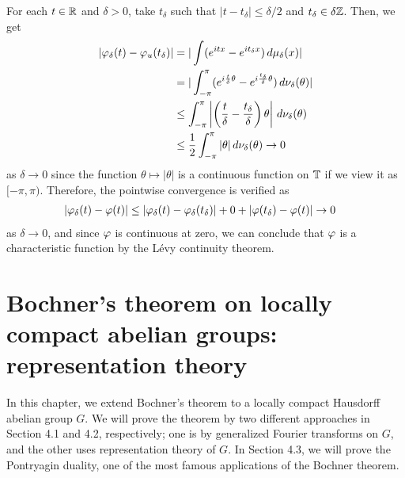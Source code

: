 \documentclass[a4paper]{article}
\begin{document}
\begin{pf}
For each $t\in\mathbb{R}$ and $\delta>0$, take $t_\delta$ such that $|t-t_\delta|\le\delta/2$ and $t_\delta\in\delta\mathbb{Z}$.
Then, we get
\begin{align*}
|\varphi_\delta(t)-\varphi_u(t_\delta)|
&=|\int(e^{itx}-e^{it_\delta x})\,d\mu_\delta(x)|\\
&=|\int_{-\pi}^\pi(e^{i\frac t\delta\theta}-e^{i\frac{t_\delta}\delta\theta})\,d\nu_\delta(\theta)|\\
&\le\int_{-\pi}^\pi\left|\left(\frac t\delta-\frac{t_\delta}\delta\right)\theta\right|\,d\nu_\delta(\theta)\\
&\le\frac12\int_{-\pi}^\pi|\theta|\,d\nu_\delta(\theta)\to0
\end{align*}
as $\delta\to0$ since the function $\theta\mapsto|\theta|$ is a continuous function on $\mathbb{T}$ if we view it as $[-\pi,\pi)$.
Therefore, the pointwise convergence is verified as
\begin{align*}
|\varphi_\delta(t)-\varphi(t)|&\le|\varphi_\delta(t)-\varphi_\delta(t_\delta)|+0+|\varphi(t_\delta)-\varphi(t)|\to0
\end{align*}
as $\delta\to0$, and since $\varphi$ is continuous at zero, we can conclude that $\varphi$ is a characteristic function by the L\'evy continuity theorem.
\end{pf}



\iffalse
\subsection{Notes on non-locally compact groups}
bochner
measure <=> pos def continuous

schwarts bochner (finite condition removed)
tempered measure <=> pos def tempered dist


on hilbert space
measure <=> pos def continuous + trace class
\fi









\newpage
\section{Bochner's theorem on locally compact abelian groups: representation theory}

In this chapter, we extend Bochner's theorem to a locally compact Hausdorff abelian group $G$.
We will prove the theorem by two different approaches in Section 4.1 and 4.2, respectively; one is by generalized Fourier transforms on $G$, and the other uses representation theory of $G$.
In Section 4.3, we will prove the Pontryagin duality, one of the most famous applications of the Bochner theorem.
\end{document}
